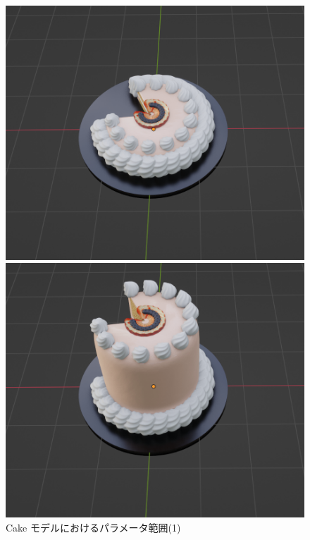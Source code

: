\begin{figure}[h]
 \begin{minipage}[b]{0.48\linewidth}
  \centering
  \includegraphics[scale=0.25]{./imgs/cakeParamMean/heightMin.png}
 \end{minipage}
 \begin{minipage}[b]{0.48\linewidth}
  \centering
  \includegraphics[scale=0.25]{./imgs/cakeParamMean/heightMax.png}
 \end{minipage}
 \caption{Cake モデルにおけるパラメータ範囲(1)}\label{fig:cakeParamMean_1}
\end{figure}

